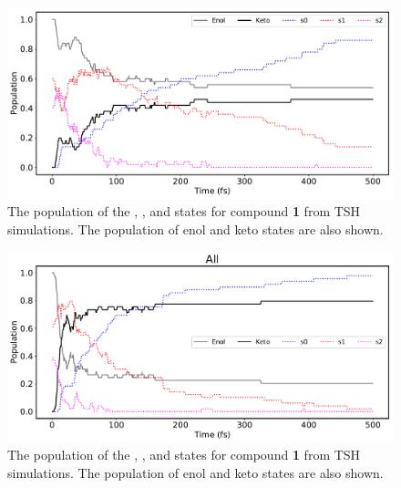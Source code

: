 \begin{figure}[H]
\centering
  \includegraphics[width=0.9\linewidth]{3nonradiativedecay/HC_1_populations.pdf}
  \caption[Populations of \textbf{HC1} in nonadiabatic dynamics simulations]{The population of the \szero{}, \sone{}, and \stwo{} states for compound \textbf{1} from \ac{TSH} simulations. The population of enol and keto states are also shown.}
  \label{figure: HC_1_Populations}
\end{figure}

\begin{figure}[H]
\centering
  \includegraphics[width=0.9\linewidth]{3nonradiativedecay/HC_5_populations.pdf}
  \caption[Populations of \textbf{HC5} in nonadiabatic dynamics simulations]{The population of the \szero{}, \sone{}, and \stwo{} states for compound \textbf{1} from \ac{TSH} simulations. The population of enol and keto states are also shown.}
  \label{figure: HC_5_Populations}
\end{figure}

